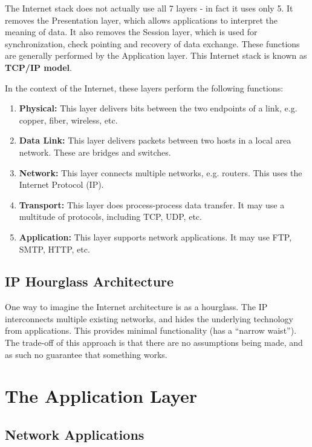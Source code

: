 \documentclass[12pt,letterpaper]{amsbook}
\theoremstyle{definition}
\begin{document}
The Internet stack does not actually use all 7 layers - in fact it uses only 5. It removes the Presentation layer, which allows applications to interpret the meaning of data. It also removes the Session layer, which is used for synchronization, check pointing and recovery of data exchange. These functions are generally performed by the Application layer. This Internet stack is known as \textbf{TCP/IP model}.

In the context of the Internet, these layers perform the following functions:

\begin{enumerate}
  \item \textbf{Physical:} This layer delivers bits between the two endpoints of a link, e.g. copper, fiber, wireless, etc.
  \item \textbf{Data Link:} This layer delivers packets between two hosts in a local area network. These are bridges and switches.
  \item \textbf{Network:} This layer connects multiple networks, e.g. routers. This uses the Internet Protocol (IP).
  \item \textbf{Transport:} This layer does process-process data transfer. It may use a multitude of protocols, including TCP, UDP, etc.
  \item \textbf{Application:} This layer supports network applications. It may use FTP, SMTP, HTTP, etc.
\end{enumerate}

\section{IP Hourglass Architecture}

One way to imagine the Internet architecture is as a hourglass. The IP interconnects multiple existing networks, and hides the underlying technology from applications. This provides minimal functionality (has a ``narrow waist''). The trade-off of this approach is that there are no assumptions being made, and as such no guarantee that something works.

\chapter{The Application Layer}

\section{Network Applications}
\end{document}

